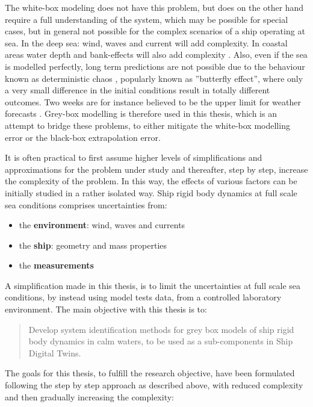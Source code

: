 The white-box modeling does not have this problem, but does on the other hand require a full understanding of the system, which may be possible for special cases, but in general not possible for the complex scenarios of a ship operating at sea. 
In the deep sea: wind, waves and current will add complexity. In coastal areas water depth and bank-effects will also add complexity \cite{nielsen_machine_2022}. 
Also, even if the sea is modelled perfectly, long term predictions are not possible due to the behaviour known as deterministic chaos \cite{lorenz_deterministic_1963}, popularly known as ''butterfly effect'', where only a very small difference in the initial conditions result in totally different outcomes. Two weeks are for instance believed to be the upper limit for weather forecasts  \cite{zhang_what_2019}. Grey-box modelling is therefore used in this thesis, which is an attempt to bridge these problems, to either mitigate the white-box modelling error or the black-box extrapolation error. 

It is often practical to first assume higher levels of simplifications and approximations for the problem under study and thereafter, step by step, increase the complexity of the problem. In this way, the effects of various factors can be initially studied in a rather isolated way. 
Ship rigid body dynamics at full scale sea conditions comprises uncertainties from:
\begin{itemize}
    \item the \textbf{environment}: wind, waves and currents
    \item the \textbf{ship}: geometry and mass properties
    \item the \textbf{measurements}
\end{itemize}

\noindent A simplification made in this thesis, is to limit the uncertainties at full scale sea conditions, by instead using model tests data, from a controlled laboratory environment. The main objective with this thesis is to:
\begin{quote} 
Develop system identification methods for grey box models of ship rigid body dynamics in calm waters, to be used as a sub-components in Ship Digital Twins. 
\end{quote}

\noindent 
The goals for this thesis, to fulfill the research objective, have been formulated following the step by step approach as described above, with reduced complexity and then gradually increasing the complexity:

